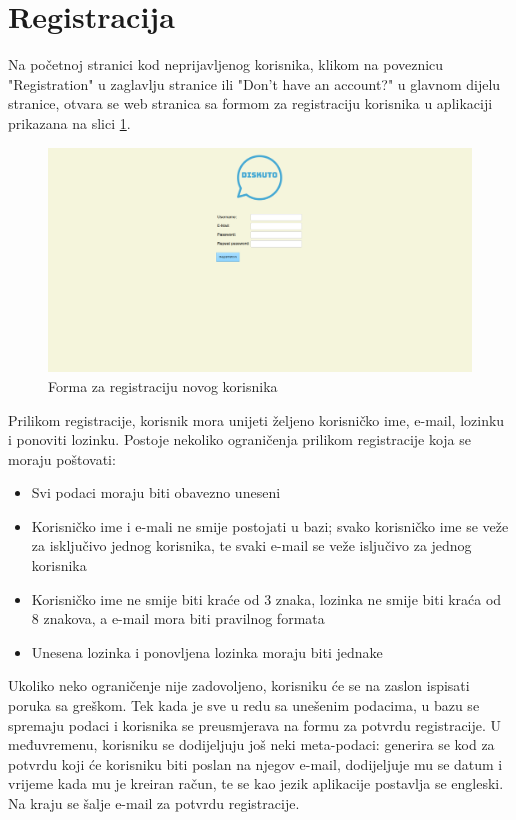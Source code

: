 \documentclass{foi}
\begin{document}
\section{Registracija}

Na početnoj stranici kod neprijavljenog korisnika, klikom na poveznicu "Registration" u zaglavlju stranice ili "Don't have an account?" u glavnom dijelu stranice, otvara se web stranica sa formom za registraciju korisnika u aplikaciji prikazana na slici \ref{registracija}.

\begin{figure}[h!]
    \centering
    \includegraphics[width=1\textwidth]{slike/registracija.png}
    \caption{Forma za registraciju novog korisnika}
    \label{registracija}
\end{figure}

Prilikom registracije, korisnik mora unijeti željeno korisničko ime, e-mail, lozinku i ponoviti lozinku. Postoje nekoliko ograničenja prilikom registracije koja se moraju poštovati:

\begin{itemize}
\item Svi podaci moraju biti obavezno uneseni
\item Korisničko ime i e-mali ne smije postojati u bazi; svako korisničko ime se veže za isključivo jednog korisnika, te svaki e-mail se veže isljučivo za jednog korisnika
\item Korisničko ime ne smije biti kraće od 3 znaka, lozinka ne smije biti kraća od 8 znakova, a e-mail mora biti pravilnog formata
\item Unesena lozinka i ponovljena lozinka moraju biti jednake
\end{itemize}

Ukoliko neko ograničenje nije zadovoljeno, korisniku će se na zaslon ispisati poruka sa greškom. Tek kada je sve u redu sa unešenim podacima, u bazu se spremaju podaci i korisnika se preusmjerava na formu za potvrdu registracije. U međuvremenu, korisniku se dodijeljuju još neki meta-podaci: generira se kod za potvrdu koji će korisniku biti poslan na njegov e-mail, dodijeljuje mu se datum i vrijeme kada mu je kreiran račun, te se kao jezik aplikacije postavlja se engleski. Na kraju se šalje e-mail za potvrdu registracije.
\end{document}

